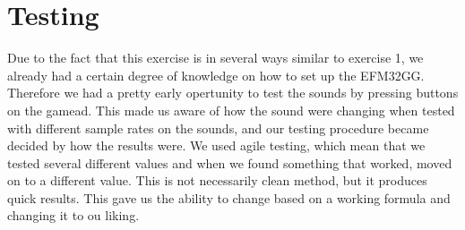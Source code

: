 \section{Testing}

Due to the fact that this exercise is in several ways similar to exercise 1, we
already had a certain degree of knowledge on how to set up the EFM32GG.
Therefore we had a pretty early opertunity to test the sounds by pressing
buttons on the gamead. This made us aware of how the sound were changing when
tested with different sample rates on the sounds, and our testing procedure
became decided by how the results were. We used agile testing, which mean that
we tested several different values and when we found something that worked,
moved on to a different value. This is not necessarily clean method, but it
produces quick results. This gave us the ability to change based on a working
formula and changing it to ou liking.
